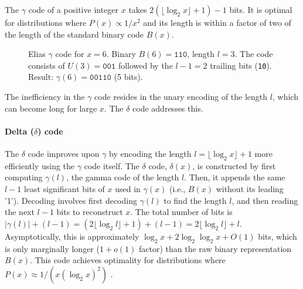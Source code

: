 \begin{theorem}
    The $\gamma$ code of a positive integer $x$ takes $2(\lfloor \log_2 x \rfloor + 1) - 1$ bits. It is optimal for distributions where $P(x) \propto 1/x^2$ and its length is within a factor of two of the length of the standard binary code $B(x)$.
\end{theorem}

\begin{figure}[hbtp]
    \centering
    \caption{Elias $\gamma$ code for $x=6$. Binary $B(6)=\texttt{110}$, length $l=3$. The code consists of $U(3)=\texttt{001}$ followed by the $l-1=2$ trailing bits (\texttt{10}). Result: $\gamma(6)=\texttt{00110}$ (5 bits).}
    \label{fig:gamma_code_example}
\end{figure}

\noindent The inefficiency in the $\gamma$ code resides in the unary encoding of the length $l$, which can become long for large $x$. The $\delta$ code addresses this.

\paragraph{Delta ($\delta$) code} The $\delta$ code improves upon $\gamma$ by encoding the length $l = \lfloor \log_2 x \rfloor + 1$ more efficiently using the $\gamma$ code itself. The $\delta$ code, $\delta(x)$, is constructed by first computing $\gamma(l)$, the gamma code of the length $l$. Then, it appends the same $l-1$ least significant bits of $x$ used in $\gamma(x)$ (i.e., $B(x)$ without its leading '1').
Decoding involves first decoding $\gamma(l)$ to find the length $l$, and then reading the next $l-1$ bits to reconstruct $x$. The total number of bits is $|\gamma(l)| + (l-1) = (2\lfloor \log_2 l \rfloor + 1) + (l-1) = 2\lfloor \log_2 l \rfloor + l$. Asymptotically, this is approximately $\log_2 x + 2\log_2 \log_2 x + O(1)$ bits, which is only marginally longer ($1+o(1)$ factor) than the raw binary representation $B(x)$. This code achieves optimality for distributions where $P(x) \approx 1/(x(\log_2 x)^2)$ \cite{ferragina2023pearls}.

